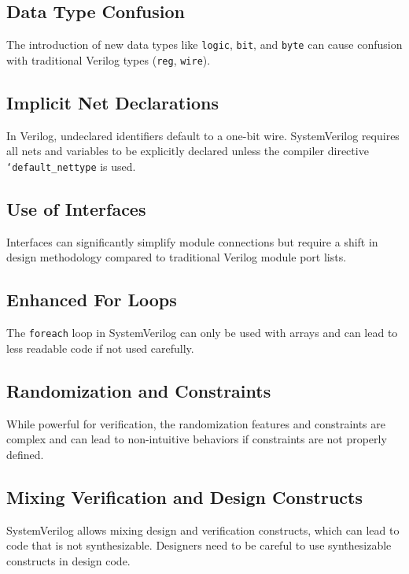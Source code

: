 \subsection{Data Type Confusion}
The introduction of new data types like \texttt{logic}, \texttt{bit}, and \texttt{byte} can cause confusion with traditional Verilog types (\texttt{reg}, \texttt{wire}).

\subsection{Implicit Net Declarations}
In Verilog, undeclared identifiers default to a one-bit wire. SystemVerilog requires all nets and variables to be explicitly declared unless the compiler directive \texttt{`default\_nettype} is used.

\subsection{Use of Interfaces}
Interfaces can significantly simplify module connections but require a shift in design methodology compared to traditional Verilog module port lists.

\subsection{Enhanced For Loops}
The \texttt{foreach} loop in SystemVerilog can only be used with arrays and can lead to less readable code if not used carefully.

\subsection{Randomization and Constraints}
While powerful for verification, the randomization features and constraints are complex and can lead to non-intuitive behaviors if constraints are not properly defined.

\subsection{Mixing Verification and Design Constructs}
SystemVerilog allows mixing design and verification constructs, which can lead to code that is not synthesizable. Designers need to be careful to use synthesizable constructs in design code.





